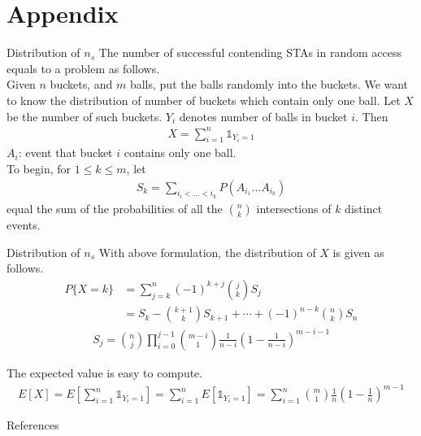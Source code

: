 \documentclass[10pt]{beamer}
\begin{document}
%
\section{Appendix}
\begin{frame}{Distribution of $n_s$}
	The number of successful contending STAs in random access equals to a problem as follows. \\
	Given \alert{$n$} buckets, and \alert{$m$} balls, put the balls randomly into the buckets. 
	We want to know the distribution of number of buckets which contain only one ball.
	Let \alert{$X$} be the number of such buckets. \alert{$Y_i$} denotes number of balls in bucket $i$. 
	Then
	\begin{align*}
	X = \sum_{i=1}^n\mathds{1}_{Y_i = 1} 
	\end{align*}
	\alert{$A_i$}: event that bucket $i$ contains only one ball. \\
	To begin, for $1\leq k \leq m$, let
	\begin{align*}
	S_k = \sum_{i_i< \ldots < i_k}P (A_{i_1}\ldots A_{i_k})
	\end{align*}
	equal the sum of the probabilities of all the $\binom{n}{k}$ intersections of $k$ distinct events. 
\end{frame}

\begin{frame}{Distribution of $n_s$}
	With above formulation, the distribution of $X$ is given as follows. \\ \cite[p.74-76]{ross2014introduction}
	\begin{align*}
		P\lbrace X = k \rbrace 
			&= \sum_{j=k}^n  (-1)^{k+j}\binom{j}{k}S_j \\ 
			&= S_k - \binom{k+1}{k}S_{k+1}+\cdots + (-1)^{n-k}\binom{n}{k}S_{n} 
	\end{align*}	
	\begin{align*}
		S_j = \binom {n}{j} \prod_{i=0}^{j-1} \binom{m-i}{1}\frac{1}{n-i} (1-\frac{1}{n-i})^{m-i-1} \nonumber
	\end{align*}
	
	The expected value is easy to compute.
	\begin{align}
	E[X] = E[\sum_{i=1}^n\mathds{1}_{Y_i = 1}] = \sum_{i=1}^nE[\mathds{1}_{Y_i = 1}] = \sum_{i=1}^n\binom{m}{1}\frac{1}{n} (1-\frac{1}{n})^{m-1}
	\label{expt_ns}
	\end{align}
\end{frame}

\begin{frame}[allowframebreaks]{References}
    
    
\end{frame}

    
\end{document}
